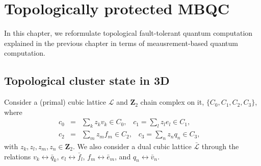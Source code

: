 \chapter{Topologically protected MBQC}
\label{Chap:TMBQC}
In this chapter, 
we reformulate topological fault-tolerant quantum computation
explained in the previous chapter
in terms of meausrement-based quantum computation.

\section{Topological cluster state in 3D}
Consider a (primal) cubic lattice $\mathcal{L}$ 
and $\mathbf{Z}_2$ chain complex on it, $\{ C_0, C_1, C_2, C_3\}$,
where
\begin{eqnarray}
c_0 &=& \sum _k z_k v_k \in C_0, \;\;\;
c_1 = \sum _l z_l e_l \in C_1, 
\\
c_2 &=& \sum _m z_m f_m \in C_2, \;\;\;
c_3 = \sum _n z_n q_n \in C_3, \;\;\;
\end{eqnarray}
with $z_k,z_l, z_m, z_n \in \mathbf{Z}_2$.
We also consider a dual cubic lattice $\bar{\mathcal{L}}$
through the relations $v_k \leftrightarrow \bar q_k$,
$e_l \leftrightarrow \bar f_l$, $f_m \leftrightarrow \bar e_m$,
and $q_n \leftrightarrow \bar v_n$.

